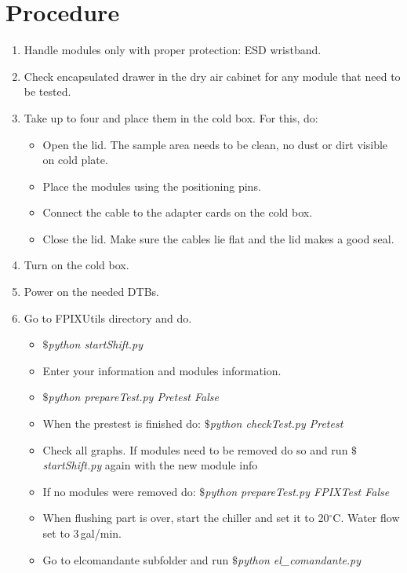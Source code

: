\documentclass[12pt]{unlsilabsop}
\begin{document}
\section{Procedure}

\begin{enumerate}
    \item Handle modules only with proper protection: ESD wristband.
    \item Check encapsulated drawer in the dry air cabinet for any module that need to be tested.
    \item Take up to four and place them in the cold box. For this, do:
    \begin{itemize}
        \item Open the lid. The sample area needs to be clean, no dust or dirt visible on cold plate.
        \item Place the modules using the positioning pins.
        \item Connect the cable to the adapter cards on the cold box.
        \item Close the lid. Make sure the cables lie flat and the lid makes a good seal.
    \end{itemize}    
    \item Turn on 	the cold box. %
    \item Power on the needed DTBs.
    \item Go to FPIXUtils directory and do.
    \begin{itemize}
    		\item {$\$ $\it{python startShift.py}}
    		\item Enter your information and modules information.
    		\item {$\$ $\it{python prepareTest.py Pretest False}}
    		\item When the prestest is finished do: {$\$ $\it{python checkTest.py Pretest}}
    		\item Check all graphs. If modules need to be removed do so and run {$\$ $\it{startShift.py}} again with the new module info
    		\item If no modules were removed do: {$\$ $\it{python prepareTest.py FPIXTest False}}
    		\item When flushing part is over, start the chiller and set it to 20$^\circ$C. Water flow set to 3\,gal/min.
    		\item Go to elcomandante subfolder and run {$\$ $\it{python el\_comandante.py}}

\end{itemize}
\end{enumerate}
\end{document}
